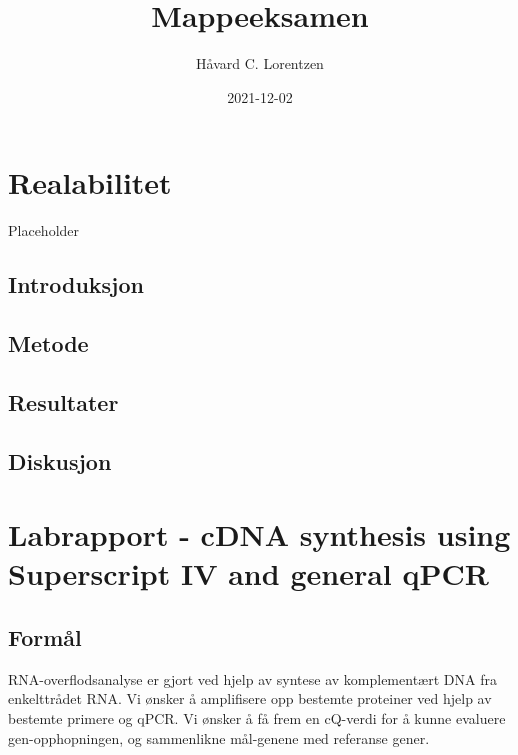 \documentclass[
]{book}
\title{Mappeeksamen}
\author{Håvard C. Lorentzen}
\date{2021-12-02}
\begin{document}
\maketitle

{
\setcounter{tocdepth}{1}
\tableofcontents
}
\hypertarget{realabilitet}{%
\chapter{Realabilitet}\label{realabilitet}}

Placeholder

\hypertarget{introduksjon}{%
\section{Introduksjon}\label{introduksjon}}

\hypertarget{metode}{%
\section{Metode}\label{metode}}

\hypertarget{resultater}{%
\section{Resultater}\label{resultater}}

\hypertarget{diskusjon}{%
\section{Diskusjon}\label{diskusjon}}

\hypertarget{labrapport---cdna-synthesis-using-superscript-iv-and-general-qpcr}{%
\chapter{Labrapport - cDNA synthesis using Superscript IV and general qPCR}\label{labrapport---cdna-synthesis-using-superscript-iv-and-general-qpcr}}

\hypertarget{formuxe5l}{%
\section{Formål}\label{formuxe5l}}

RNA-overflodsanalyse er gjort ved hjelp av syntese av komplementært DNA fra enkelttrådet RNA. Vi ønsker å
amplifisere opp bestemte proteiner ved hjelp av bestemte primere og qPCR. Vi ønsker å få frem en cQ-verdi for å kunne evaluere gen-opphopningen, og sammenlikne mål-genene med referanse gener.
\end{document}
